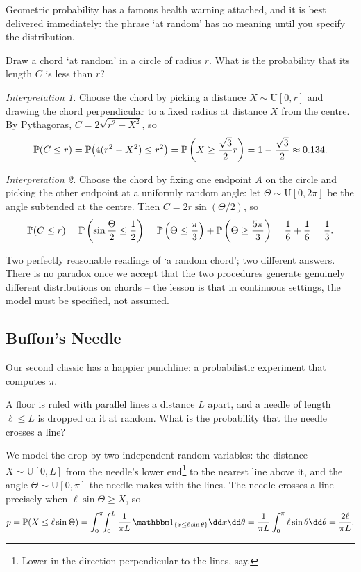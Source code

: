 \documentclass[a4paper]{scrartcl}
\begin{document}
Geometric probability has a famous health warning attached, and it is best delivered immediately: the phrase `at random' has no meaning until you specify the distribution.

\begin{example}
	Draw a chord `at random' in a circle of radius $r$. What is the probability that its length $C$ is less than $r$?

	\emph{Interpretation 1.} Choose the chord by picking a distance $X \sim \mathrm{U}[0, r]$ and drawing the chord perpendicular to a fixed radius at distance $X$ from the centre. By Pythagoras, $C = 2\sqrt{r^2 - X^2}$, so
	$$
	\mathbb{P}(C \leq r) = \mathbb{P}\big(4(r^2 - X^2) \leq r^2\big) = \mathbb{P}\left(X \geq \frac{\sqrt3}{2}r\right) = 1 - \frac{\sqrt3}{2} \approx 0.134.
	$$

	\emph{Interpretation 2.} Choose the chord by fixing one endpoint $A$ on the circle and picking the other endpoint at a uniformly random angle: let $\Theta \sim \mathrm{U}[0, 2\pi]$ be the angle subtended at the centre. Then $C = 2r\sin(\Theta/2)$, so
	$$
	\mathbb{P}(C \leq r) = \mathbb{P}\left(\sin\frac{\Theta}{2} \leq \frac12\right) = \mathbb{P}\left(\Theta \leq \frac{\pi}{3}\right) + \mathbb{P}\left(\Theta \geq \frac{5\pi}{3}\right) = \frac16 + \frac16 = \frac13.
	$$

	Two perfectly reasonable readings of `a random chord'; two different answers. There is no paradox once we accept that the two procedures generate genuinely different distributions on chords -- the lesson is that in continuous settings, the model must be specified, not assumed.
\end{example}

\subsection{Buffon's Needle}

Our second classic has a happier punchline: a probabilistic experiment that computes $\pi$.

\begin{example}
	A floor is ruled with parallel lines a distance $L$ apart, and a needle of length $\ell \leq L$ is dropped on it at random. What is the probability that the needle crosses a line?

	We model the drop by two independent random variables: the distance $X \sim \mathrm{U}[0, L]$ from the needle's lower end\footnote{Lower in the direction perpendicular to the lines, say.} to the nearest line above it, and the angle $\Theta \sim \mathrm{U}[0, \pi]$ the needle makes with the lines. The needle crosses a line precisely when $\ell\sin\Theta \geq X$, so
	$$
	p = \PP(X \leq \ell\sin\Theta) = \int_0^{\pi}\!\!\int_0^{L} \frac{1}{\pi L}\,\ii_{\{x \leq \ell\sin\theta\}} \dd x \dd\theta = \frac{1}{\pi L}\int_0^{\pi} \ell \sin\theta \dd\theta = \frac{2\ell}{\pi L}.
	$$
\end{example}
\end{document}
